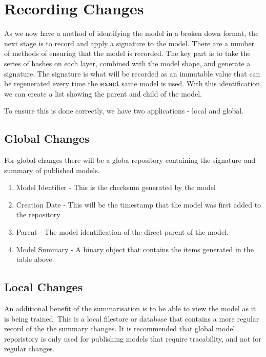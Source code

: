 \section{Recording Changes}
As we now have a method of identifying the model in a broken down format, the next stage is to record and apply a signature to the model. There are a number of methods of ensuring that the model is recorded. The key part is to take the series of hashes on each layer, combined with the model shape, and generate a signature. The signature is what will be recorded as an immutable value that can be regenerated every time the \textbf{exact} same model is used. With this identification, we can create a list showing the parent and child of the model.

To ensure this is done correctly, we have two applications - local and global.
\subsection{Global Changes}
For global changes there will be a globa repository containing the signature and summary of published models. 

\begin{enumerate}
    \item Model Identifier - This is the checksum generated by the model
    \item Creation Date - This will be the timestamp that the model was first added to the repository
    \item Parent - The model identification of the direct parent of the model.
    \item Model Summary - A binary object that contains the items generated in the table above.
    \end{enumerate}
\subsection{Local Changes}

An additional benefit of the summarisation is to be able to view the model as it is being trained. This is a local filestore or database that contains a more regular record of the the summary changes. It is recommended that global model reporistory is only used for publishing models that require tracability, and not for regular changes.
    